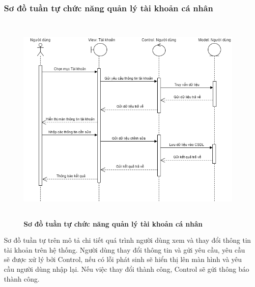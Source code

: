 \subsubsection{Sơ đồ tuần tự chức năng quản lý tài khoản cá nhân}
\begin{figure}[H]
  \centering
  \includegraphics[width=14cm,height=10.5cm]{Images/sequence/sequence_manage_info.png}
  \caption[Sơ đồ tuần tự chức năng quản lý tài khoản cá nhân]{\bfseries \fontsize{12pt}{0pt}
  \selectfont Sơ đồ tuần tự chức năng quản lý tài khoản cá nhân}
  \label{sequence_account} %
\end{figure}
Sơ đồ tuần tự trên mô tả chi tiết quá trình người dùng xem và thay đổi thông tin tài khoản trên hệ thống. Người dùng thay đổi thông tin và gửi yêu cầu, 
yêu cầu sẽ được xử lý bởi Control, nếu có lỗi phát sinh sẽ hiển thị lên màn hình và yêu cầu người dùng nhập lại. Nếu việc thay đổi thành công, Control sẽ gửi thông báo 
thành công.  

